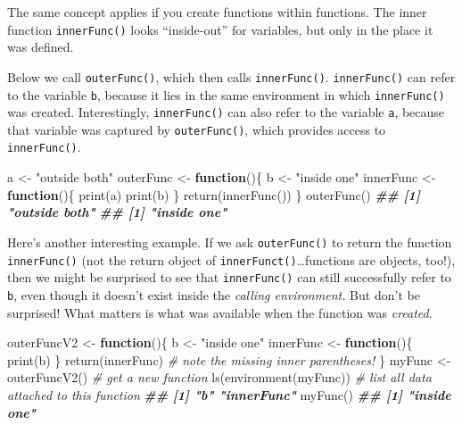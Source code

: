 \documentclass[
  12pt,
  krantz2]{krantz}
\makeatletter
\newenvironment{Shaded}{\begin{snugshade}}{\end{snugshade}}
\newcommand{\CommentTok}[1]{\textcolor[rgb]{0.37,0.37,0.37}{\textit{#1}}}
\newcommand{\ControlFlowTok}[1]{\textcolor[rgb]{0.27,0.27,0.27}{\textbf{#1}}}
\newcommand{\DocumentationTok}[1]{\textcolor[rgb]{0.37,0.37,0.37}{\textbf{\textit{#1}}}}
\newcommand{\FunctionTok}[1]{\textcolor[rgb]{0,0,0}{#1}}
\newcommand{\NormalTok}[1]{#1}
\newcommand{\OtherTok}[1]{\textcolor[rgb]{0.37,0.37,0.37}{#1}}
\newcommand{\StringTok}[1]{\textcolor[rgb]{0.5,0.5,0.5}{#1}}
\newenvironment{kframe}{%
\medskip{}
\setlength{\fboxsep}{.8em}
 \def\at@end@of@kframe{}%
 \ifinner\ifhmode%
  \def\at@end@of@kframe{\end{minipage}}%
  \begin{minipage}{\columnwidth}%
 \fi\fi%
 \def\FrameCommand##1{\hskip\@totalleftmargin \hskip-\fboxsep
 \colorbox{shadecolor}{##1}\hskip-\fboxsep
     \hskip-\linewidth \hskip-\@totalleftmargin \hskip\columnwidth}%
 \MakeFramed {\advance\hsize-\width
   \@totalleftmargin\z@ \linewidth\hsize
   \@setminipage}}%
 {\par\unskip\endMakeFramed%
 \at@end@of@kframe}
\renewenvironment{Shaded}{\begin{kframe}}{\end{kframe}}
\makeatother
\begin{document}
The same concept applies if you create functions within functions. The inner function \texttt{innerFunc()} looks ``inside-out'' for variables, but only in the place it was defined.

Below we call \texttt{outerFunc()}, which then calls \texttt{innerFunc()}. \texttt{innerFunc()} can refer to the variable \texttt{b}, because it lies in the same environment in which \texttt{innerFunc()} was created. Interestingly, \texttt{innerFunc()} can also refer to the variable \texttt{a}, because that variable was captured by \texttt{outerFunc()}, which provides access to \texttt{innerFunc()}.

\begin{Shaded}
\begin{Highlighting}[]
\NormalTok{a }\OtherTok{\textless{}{-}} \StringTok{"outside both"}
\NormalTok{outerFunc }\OtherTok{\textless{}{-}} \ControlFlowTok{function}\NormalTok{()\{}
\NormalTok{  b }\OtherTok{\textless{}{-}} \StringTok{"inside one"}
\NormalTok{  innerFunc }\OtherTok{\textless{}{-}} \ControlFlowTok{function}\NormalTok{()\{}
    \FunctionTok{print}\NormalTok{(a) }
    \FunctionTok{print}\NormalTok{(b)}
\NormalTok{  \}}
  \FunctionTok{return}\NormalTok{(}\FunctionTok{innerFunc}\NormalTok{())}
\NormalTok{\}}
\FunctionTok{outerFunc}\NormalTok{()}
\DocumentationTok{\#\# [1] "outside both"}
\DocumentationTok{\#\# [1] "inside one"}
\end{Highlighting}
\end{Shaded}

Here's another interesting example. If we ask \texttt{outerFunc()} to return the function \texttt{innerFunc()} (not the return object of \texttt{innerFunct()}\ldots functions are objects, too!), then we might be surprised to see that \texttt{innerFunc()} can still successfully refer to \texttt{b}, even though it doesn't exist inside the \emph{calling environment.} But don't be surprised! What matters is what was available when the function was \emph{created}.

\begin{Shaded}
\begin{Highlighting}[]
\NormalTok{outerFuncV2 }\OtherTok{\textless{}{-}} \ControlFlowTok{function}\NormalTok{()\{}
\NormalTok{  b }\OtherTok{\textless{}{-}} \StringTok{"inside one"}
\NormalTok{  innerFunc }\OtherTok{\textless{}{-}} \ControlFlowTok{function}\NormalTok{()\{}
    \FunctionTok{print}\NormalTok{(b)}
\NormalTok{  \}}
  \FunctionTok{return}\NormalTok{(innerFunc) }\CommentTok{\# note the missing inner parentheses!}
\NormalTok{\}}
\NormalTok{myFunc }\OtherTok{\textless{}{-}} \FunctionTok{outerFuncV2}\NormalTok{() }\CommentTok{\# get a new function}
\FunctionTok{ls}\NormalTok{(}\FunctionTok{environment}\NormalTok{(myFunc)) }\CommentTok{\# list all data attached to this function}
\DocumentationTok{\#\# [1] "b"         "innerFunc"}
\FunctionTok{myFunc}\NormalTok{()}
\DocumentationTok{\#\# [1] "inside one"}
\end{Highlighting}
\end{Shaded}
\end{document}
